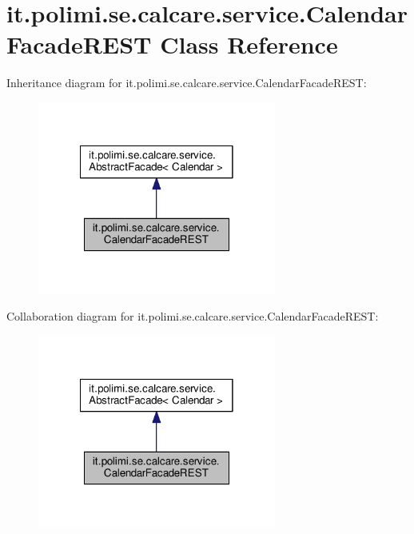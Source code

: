 \hypertarget{classit_1_1polimi_1_1se_1_1calcare_1_1service_1_1CalendarFacadeREST}{}\section{it.\+polimi.\+se.\+calcare.\+service.\+Calendar\+Facade\+R\+E\+S\+T Class Reference}
\label{classit_1_1polimi_1_1se_1_1calcare_1_1service_1_1CalendarFacadeREST}


Inheritance diagram for it.\+polimi.\+se.\+calcare.\+service.\+Calendar\+Facade\+R\+E\+S\+T\+:
\nopagebreak
\begin{figure}[H]
\begin{center}
\leavevmode
\includegraphics[width=222pt]{classit_1_1polimi_1_1se_1_1calcare_1_1service_1_1CalendarFacadeREST__inherit__graph}
\end{center}
\end{figure}


Collaboration diagram for it.\+polimi.\+se.\+calcare.\+service.\+Calendar\+Facade\+R\+E\+S\+T\+:
\nopagebreak
\begin{figure}[H]
\begin{center}
\leavevmode
\includegraphics[width=222pt]{classit_1_1polimi_1_1se_1_1calcare_1_1service_1_1CalendarFacadeREST__coll__graph}
\end{center}
\end{figure}
